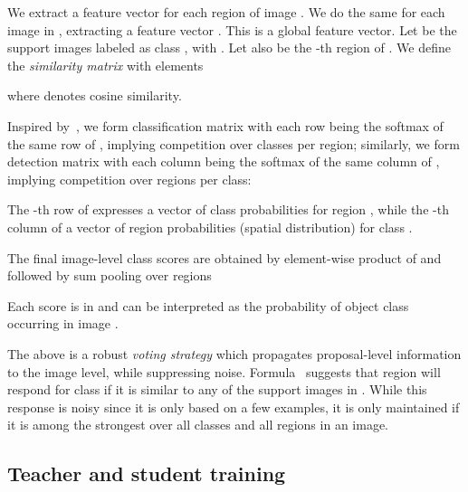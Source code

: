 \documentclass[review]{elsarticle}
\begin{document}
{We} extract a feature vector  for each region  of image . We do the same for each image  in , extracting a feature vector . This is a global feature vector.
Let  be the support images labeled as class , with . Let also  be the -th region of .
We define the  \emph{similarity matrix}  with elements

where  denotes cosine similarity.


Inspired by~\cite{wsddn},
{we form  classification matrix  with each row being the softmax of the same row of , implying competition over classes per region; similarly, we form  detection matrix  with each column being the softmax of the same column of , implying competition over regions per class:}

The -th row of  expresses a vector of class probabilities for region , while the -th column of  a vector of region probabilities (spatial distribution) for class .

The final image-level class scores  are obtained by element-wise product of  and  followed by sum pooling over regions

Each score  is in  and can be interpreted as the probability of object class  occurring in image .


The above is a robust \emph{voting strategy} which propagates proposal-level information to the image level, while suppressing noise. Formula~ suggests that region  will respond for class  if it is similar to any of the support images in . While this response is noisy since it is only based on a few examples, it is only maintained if it is among the strongest over all classes and all regions {in an image}.





\subsection{Teacher and student training}
\label{Sec:teacherstudent}
\end{document}
